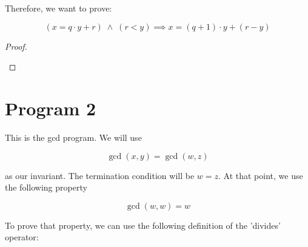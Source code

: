 \documentclass[11pt]{amsart}
\begin{document}
Therefore, we want to prove:

\begin{equation}
	 (x = q \cdot y + r) \; \land \; (r < y) \implies  x = (q + 1) \cdot y + (r - y)
\end{equation}

\begin{proof} 
	\begin{deriv}
	\end{deriv}
\end{proof}

\section{Program 2}

This is the gcd program.  We will use

\begin{equation}
	\gcd (x, y) = \gcd (w, z) \label{inv0}
\end{equation}

as our invariant.  The termination condition will be $w = z$.  At that point, we use the following property

\begin{equation}
	\gcd (w, w) = w \label{gcdref}
\end{equation}

To prove that property, we can use the following definition of the 'divides' operator:
\end{document}
